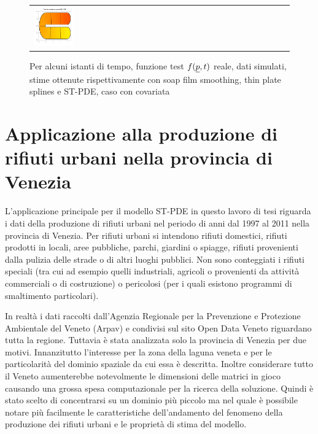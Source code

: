 \documentclass[a4paper,11pt,twoside,openright]{book}							%
\begin{document}
\begin{landscape}
\begin{figure}
\begin{tabular}{lccccc}
\includegraphics[trim=0cm 0cm 0cm 1.8cm,clip=true,width=0.19\textwidth,valign=t]{Immagini/simulazioni_covar/STSRtempo4.png}
\end{tabular}
\caption{Per alcuni istanti di tempo, funzione test $f(\protect\underline{p},t)$ reale, dati simulati, stime ottenute rispettivamente con soap film smoothing, thin plate splines e ST-PDE, caso con covariata}
\label{fig:confronto_altri_metodi_cov}
\end{figure}
\end{landscape}


\chapter{Applicazione alla produzione di rifiuti urbani nella provincia di Venezia}
\label{cap:rifiuti}

L'applicazione principale per il modello ST-PDE in questo lavoro di tesi riguarda i dati della produzione di rifiuti urbani nel periodo di anni dal 1997 al 2011 nella provincia di Venezia. Per rifiuti urbani si intendono rifiuti domestici, rifiuti prodotti in locali, aree pubbliche, parchi, giardini o spiagge, rifiuti provenienti dalla pulizia delle strade o di altri luoghi pubblici. Non sono conteggiati i rifiuti speciali (tra cui ad esempio quelli industriali, agricoli o provenienti da attività commerciali o di costruzione) o pericolosi (per i quali esistono programmi di smaltimento particolari).

In realtà i dati raccolti dall'Agenzia Regionale per la Prevenzione e Protezione Ambientale del Veneto (Arpav) e condivisi sul sito Open Data Veneto riguardano tutta la regione. Tuttavia è stata analizzata solo la provincia di Venezia per due motivi. Innanzitutto l'interesse per la zona della laguna veneta e per le particolarità del dominio spaziale da cui essa è descritta. Inoltre considerare tutto il Veneto aumenterebbe notevolmente le dimensioni delle matrici in gioco causando una grossa spesa computazionale per la ricerca della soluzione. Quindi è stato scelto di concentrarsi su un dominio più piccolo ma nel quale è possibile notare più facilmente le caratteristiche dell'andamento del fenomeno della produzione dei rifiuti urbani e le proprietà di stima del modello.
\end{document}
